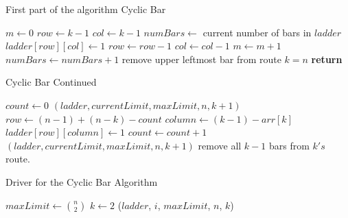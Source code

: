  \begin{algorithm}
   \caption{First part of the algorithm Cyclic Bar}
   \begin{algorithmic}[1]
     
       \State $m \gets 0$
       \State $row \gets k-1$
       \State $col \gets k-1$
       \State $numBars \gets$ current number of bars in $ladder$
         \State $ladder[row][col] \gets 1$
         \State $row \gets row-1$
         \State $col \gets col-1$
         \State $m \gets m+1$
         \State $numBars \gets numBars+1$
       \EndWhile
         \State remove upper leftmost bar from route $k=n$
       \EndIf
       \State \textbf{return}
     \EndIf
   \end{algorithmic}
 \end{algorithm}
  \begin{algorithm}
     \caption{Cyclic Bar Continued}
       \begin{algorithmic}[1]
         \State $count \gets 0$
             $(ladder, currentLimit, maxLimit, n, k+1)$
           \Else
             \State $row \gets (n-1) + (n-k) - count$
             \State $column \gets (k-1)-arr[k]$
             \State $ladder[row][column] \gets 1$
             \State $count \gets count + 1$
             $(ladder, currentLimit, maxLimit, n, k+1)$
           \EndIf
         \EndFor
         \State remove all $k-1$ bars from $k's$ route.
       \EndIf
       \EndFunction
     \end{algorithmic}
   \end{algorithm}
   \begin{algorithm}
     \caption{Driver for the Cyclic Bar Algorithm}
     \begin{algorithmic}[1]
         \State $maxLimit \gets {n \choose 2}$
         \State $k \gets 2$
           ($ladder$, $i$, $maxLimit$, $n$, $k$)
         \EndFor
       \EndFunction
     \end{algorithmic}
   \end{algorithm}\pagebreak

